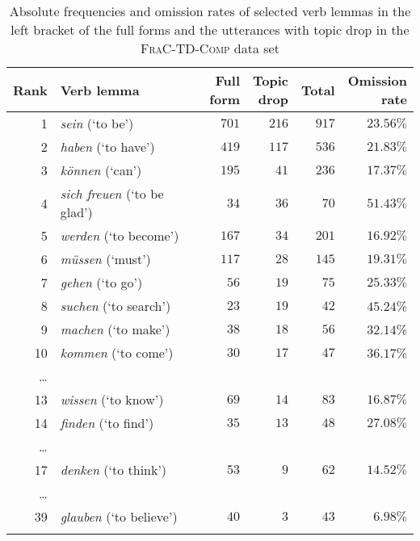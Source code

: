 \begin{table}
\caption{Absolute frequencies and omission rates of selected verb lemmas in the left bracket of the full forms and the utterances with topic drop in the \textsc{FraC-TD-Comp} data set}
\centering
\begin{tabular}{rlrrrr}
\lsptoprule
Rank &  Verb lemma &  \Centerstack[c]{Full\\form} & \Centerstack[c]{Topic\\drop} & Total & \Centerstack[c]{Omission\\rate} \\
\midrule
1 & \textit{sein} (`to be') & $701$ & $216$ & $917$ & $23.56\%$\\
2 & \textit{haben} (`to have') & $419$ & $117$ & $536$ & $21.83\%$\\
3  & \textit{können} (`can') &  $195$ & $41$ & $236$ & $17.37\%$\\
4 & \textit{sich freuen} (`to be glad') & $34$ & $36$ & $70$ & $51.43\%$\\
5 & \textit{werden} (`to become') & $167$ & $34$ & $201$ & $16.92\%$\\
6 & \textit{müssen} (`must') & $117$ & $28$ & $145$ & $19.31\%$\\
7 & \textit{gehen} (`to go') & $56$ & $19$ & $75$ & $25.33\%$ \\
8 & \textit{suchen} (`to search') & $23$ & $19$ & $42$ & $45.24$\%\\
9 & \textit{machen} (`to make') & $38$ & $18$ & $56$ & $32.14$\%\\
10 & \textit{kommen} (`to come') & $30$ & $17$ & $47$ & $36.17$\%\\
\dots & & & & &\\
13 & \textit{wissen} (`to know') & $69$ & $14$ & $83$ & $16.87\%$\\
14 & \textit{finden} (`to find') & $35$ & $13$ & $48$ & $27.08\%$\\
\dots & & & & &\\
17 & \textit{denken} (`to think') & $53$ & $9$ & $62$ & $14.52\%$\\
\dots & & & & &\\
39 & \textit{glauben} (`to believe') & $40$ & $3$ & $43$ & $6.98\%$\\
\lspbottomrule
\end{tabular}
\label{tab:FraC.Comp.verb.lemma}
\end{table}



